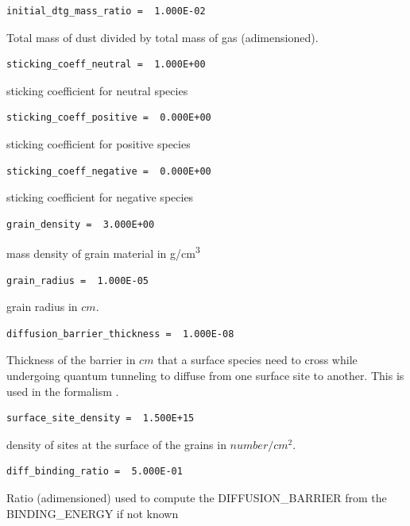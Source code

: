 \documentclass[english,a4paper,twoside]{article}
\begin{document}
\begin{verbatim}
initial_dtg_mass_ratio =  1.000E-02
\end{verbatim}
Total mass of dust divided by total mass of gas (adimensioned).

\begin{verbatim}
sticking_coeff_neutral =  1.000E+00
\end{verbatim}
sticking coefficient for neutral species

\begin{verbatim}
sticking_coeff_positive =  0.000E+00
\end{verbatim}
sticking coefficient for positive species

\begin{verbatim}
sticking_coeff_negative =  0.000E+00
\end{verbatim}
sticking coefficient for negative species

\begin{verbatim}
grain_density =  3.000E+00
\end{verbatim}
mass density of grain material in \unit{g/cm^3}

\begin{verbatim}
grain_radius =  1.000E-05
\end{verbatim}
grain radius in $\unit{cm}$.

\begin{verbatim}
diffusion_barrier_thickness =  1.000E-08
\end{verbatim}
Thickness of the barrier in $\unit{cm}$ that a surface species need to cross while undergoing quantum tunneling to diffuse from one surface site to another. This is used in the formalism \citep[see equation 10 (parameter a)]{1992ApJS...82..167H}.

\begin{verbatim}
surface_site_density =  1.500E+15
\end{verbatim}
density of sites at the surface of the grains in $\unit{number/cm^{2}}$.

\begin{verbatim}
diff_binding_ratio =  5.000E-01
\end{verbatim}
Ratio (adimensioned) used to compute the DIFFUSION\_BARRIER from the BINDING\_ENERGY if not known
\end{document}
